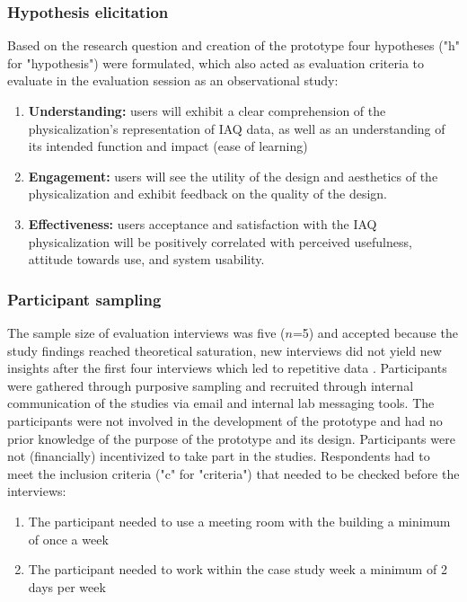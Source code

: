 \subsubsection{Hypothesis elicitation}

Based on the research question and creation of the prototype four hypotheses ("h" for "hypothesis") were formulated, which also acted as evaluation criteria to evaluate in the evaluation session as an observational study:

\begin{enumerate}
    \renewcommand{\labelenumi}{H\arabic{enumi}:}
    \item \textbf{Understanding:} users will exhibit a clear comprehension of the physicalization's representation of IAQ data, as well as an understanding of its intended function and impact (ease of learning)
    \item \textbf{Engagement:} users will see the utility of the design and aesthetics of the physicalization and exhibit feedback on the quality of the design.
    \item \textbf{Effectiveness:} users acceptance and satisfaction with the IAQ physicalization will be positively correlated with perceived usefulness, attitude towards use, and system usability.
\end{enumerate}

\subsubsection{Participant sampling}

The sample size of evaluation interviews was five ($n$=5) and accepted because the study findings reached theoretical saturation, new interviews did not yield new insights after the first four interviews which led to repetitive data \cite{steph_menken_introduction_2016}. Participants were gathered through purposive sampling and recruited through internal communication of the studies via email and internal lab messaging tools. The participants were not involved in the development of the prototype and had no prior knowledge of the purpose of the prototype and its design. Participants were not (financially) incentivized to take part in the studies. Respondents had to meet the inclusion criteria ("c" for "criteria") that needed to be checked before the interviews: 

\begin{enumerate}
    \renewcommand{\labelenumi}{C\arabic{enumi}:}
    \item The participant needed to use a meeting room with the building a minimum of once a week
    \item The participant needed to work within the case study week a minimum of 2 days per week
\end{enumerate}

